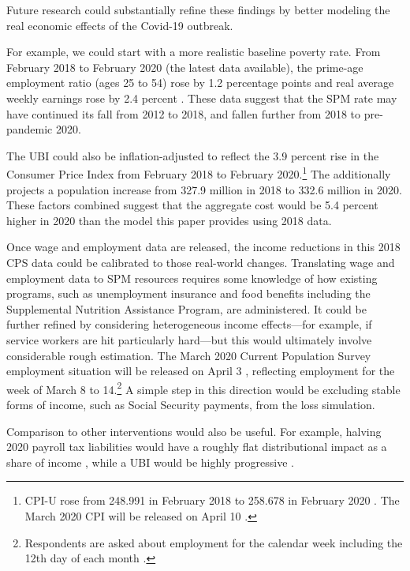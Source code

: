 \documentclass[12pt]{article}
\begin{document}
Future research could substantially refine these findings by better modeling the real economic effects of the Covid-19 outbreak.

For example, we could start with a more realistic baseline poverty rate. From February 2018 to February 2020 (the latest data available), the prime-age employment ratio (ages 25 to 54) rose by 1.2 percentage points \cite{fred_paepop} and real average weekly earnings rose by 2.4 percent \cite{bls_earnings}. These data suggest that the SPM rate may have continued its fall from 2012 to 2018, and fallen further from 2018 to pre-pandemic 2020.

The UBI could also be inflation-adjusted to reflect the 3.9 percent rise in the Consumer Price Index from February 2018 to February 2020.\footnote{CPI-U rose from 248.991 in February 2018 to 258.678 in February 2020 \cite{bls_cpi_data}. The March 2020 CPI will be released on April 10 \cite{bls_cpi_releases}.} The  additionally projects a population increase from 327.9 million in 2018 to 332.6 million in 2020. These factors combined suggest that the aggregate cost would be 5.4 percent higher in 2020 than the model this paper provides using 2018 data.

Once wage and employment data are released, the income reductions in this 2018 CPS data could be calibrated to those real-world changes. Translating wage and employment data to SPM resources requires some knowledge of how existing programs, such as unemployment insurance and food benefits including the Supplemental Nutrition Assistance Program, are administered. It could be further refined by considering heterogeneous income effects---for example, if service workers are hit particularly hard---but this would ultimately involve considerable rough estimation. The March 2020 Current Population Survey employment situation will be released on April 3 \cite{bls_releases}, reflecting employment for the week of March 8 to 14.\footnote{Respondents are asked about employment for the calendar week including the 12th day of each month \cite{bls_cps_faq}.} A simple step in this direction would be excluding stable forms of income, such as Social Security payments, from the loss simulation.

Comparison to other interventions would also be useful. For example, halving 2020 payroll tax liabilities would have a roughly flat distributional impact as a share of income \cite{taxbrain}, while a UBI would be highly progressive \cite{ghenis_yang}.
\end{document}
